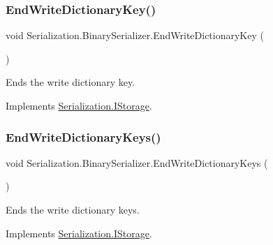 \subsubsection{\texorpdfstring{End\+Write\+Dictionary\+Key()}{EndWriteDictionaryKey()}}
{\footnotesize\ttfamily void Serialization.\+Binary\+Serializer.\+End\+Write\+Dictionary\+Key (\begin{DoxyParamCaption}{ }\end{DoxyParamCaption})\hspace{0.3cm}{\ttfamily [inline]}}



Ends the write dictionary key. 



Implements \hyperlink{interface_serialization_1_1_i_storage_a67dd08c902044dab8fbc00ee081e4908}{Serialization.\+I\+Storage}.

\mbox{\label{class_serialization_1_1_binary_serializer_a53b70a443f3bddc10ab34444ab58b08e}} 
\subsubsection{\texorpdfstring{End\+Write\+Dictionary\+Keys()}{EndWriteDictionaryKeys()}}
{\footnotesize\ttfamily void Serialization.\+Binary\+Serializer.\+End\+Write\+Dictionary\+Keys (\begin{DoxyParamCaption}{ }\end{DoxyParamCaption})\hspace{0.3cm}{\ttfamily [inline]}}



Ends the write dictionary keys. 



Implements \hyperlink{interface_serialization_1_1_i_storage_a3b92e2da24caf59872668c269d102e87}{Serialization.\+I\+Storage}.

\mbox{\label{class_serialization_1_1_binary_serializer_ad8d7709505dfa6e3e973223411397fa0}} 
